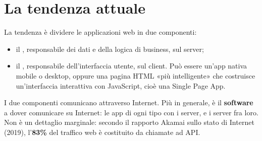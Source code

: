 \section{La tendenza attuale}

La tendenza è dividere le applicazioni web in due componenti:

\begin{itemize}
  \item il , responsabile dei dati e della logica di business, sul
        server;
  \item il , responsabile dell'interfaccia utente, sul client.
        Può essere un'app nativa mobile o desktop, oppure una pagina HTML
        «più intelligente» che costruisce un'interfaccia interattiva con
        JavaScript, cioè una Single Page App.
\end{itemize}

I due componenti comunicano attraverso Internet. Più in generale, è il
\textbf{software} a dover comunicare su Internet: le app di ogni tipo con i
server, e i server fra loro. Non è un dettaglio marginale: secondo il rapporto
Akamai sullo stato di Internet (2019), l'\textbf{83\%} del traffico web è
costituito da chiamate ad API.

